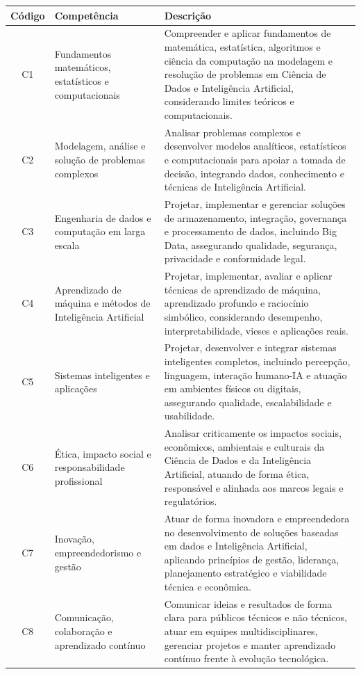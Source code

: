 \begin{quadro}[htb]
    \centering
    \caption{Relação de competências desenvolvidas ao longo do curso}
    \label{quadro:2.13}
    \begin{tabular}{|c|p{4cm}|p{10cm}|}
        \hline
        \textbf{Código} & \textbf{Competência} & \textbf{Descrição} \\ \hline
        C1 & Fundamentos matemáticos, estatísticos e computacionais & Compreender e aplicar fundamentos de matemática, estatística, algoritmos e ciência da computação na modelagem e resolução de problemas em Ciência de Dados e Inteligência Artificial, considerando limites teóricos e computacionais. \\ \hline
        C2 & Modelagem, análise e solução de problemas complexos & Analisar problemas complexos e desenvolver modelos analíticos, estatísticos e computacionais para apoiar a tomada de decisão, integrando dados, conhecimento e técnicas de Inteligência Artificial. \\ \hline
        C3 & Engenharia de dados e computação em larga escala & Projetar, implementar e gerenciar soluções de armazenamento, integração, governança e processamento de dados, incluindo Big Data, assegurando qualidade, segurança, privacidade e conformidade legal. \\ \hline
        C4 & Aprendizado de máquina e métodos de Inteligência Artificial & Projetar, implementar, avaliar e aplicar técnicas de aprendizado de máquina, aprendizado profundo e raciocínio simbólico, considerando desempenho, interpretabilidade, vieses e aplicações reais. \\ \hline
        C5 & Sistemas inteligentes e aplicações & Projetar, desenvolver e integrar sistemas inteligentes completos, incluindo percepção, linguagem, interação humano-IA e atuação em ambientes físicos ou digitais, assegurando qualidade, escalabilidade e usabilidade. \\ \hline
        C6 & Ética, impacto social e responsabilidade profissional & Analisar criticamente os impactos sociais, econômicos, ambientais e culturais da Ciência de Dados e da Inteligência Artificial, atuando de forma ética, responsável e alinhada aos marcos legais e regulatórios. \\ \hline
        C7 & Inovação, empreendedorismo e gestão & Atuar de forma inovadora e empreendedora no desenvolvimento de soluções baseadas em dados e Inteligência Artificial, aplicando princípios de gestão, liderança, planejamento estratégico e viabilidade técnica e econômica. \\ \hline
        C8 & Comunicação, colaboração e aprendizado contínuo & Comunicar ideias e resultados de forma clara para públicos técnicos e não técnicos, atuar em equipes multidisciplinares, gerenciar projetos e manter aprendizado contínuo frente à evolução tecnológica. \\ \hline
    \end{tabular}
\end{quadro}

